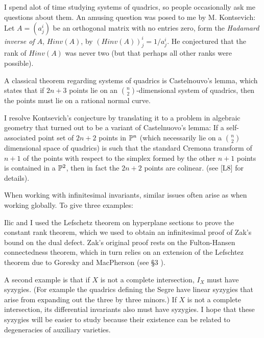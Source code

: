 
I spend alot of time studying systems of quadrics, so
people occasionally ask me questions about them. 
An amusing question was posed
to me  by M.
Kontsevich: Let $A= (a^i_j)$ be an orthogonal matrix with no
entries zero, form the {\it Hadamard inverse of $A$},
$Hinv(A)$, by $(Hinv(A))^i_j=1/{a^i_j}$. He conjectured
that the rank of $Hinv(A)$ was never two (but that perhaps all
other ranks were possible).


 A classical theorem  regarding systems of quadrics  is 
Castelnouvo's lemma, which states
that if $2n+3$ points lie on an $\binom n2$-dimensional system
of quadrics, then the points must lie on a rational normal curve.

  I resolve Kontsevich's conjecture by translating
it to a problem in algebraic geometry that turned out to be a variant
of Castelnuovo's lemma:  
If  a self-associated point set
of $2n+2$ points in $\Bbb P^{n}$ (which necessarily lie on
a $\binom n2$ dimensional space of quadrics) is such that
the standard
Cremona transform of $n+1$ of the points
 with respect to the simplex formed by
the other $n+1$ points is contained in a $\Bbb P^{2}$, then in fact 
the $2n+2$ points
are colinear.  (see
[L8] for details).

 





When working with infinitesimal invariants, similar issues
often arise as when working globally.  To give three examples:
 
Ilic and I used the
  Lefschetz theorem on hyperplane sections
to prove the constant rank theorem, which
we used to obtain an infinitesimal proof of
Zak's bound on the dual defect. Zak's original proof   rests
on the Fulton-Hansen connectedness theorem, which in turn relies
on an extension of the Lefschtez theorem due to Goresky and MacPherson
(see \S 3 ).


 
A second example is that if $X$ is not a complete intersection, $I_X$ must
have
syzygies. (For example the quadrics defining the Segre have linear syzygies
that arise from expanding out the three by three minors.) If $X$ is not a
complete intersection, its differential invariants also must 
have syzygies. I hope  that these syzygies will be easier to study because
their existence can be related to degeneracies of auxiliary varieties.

